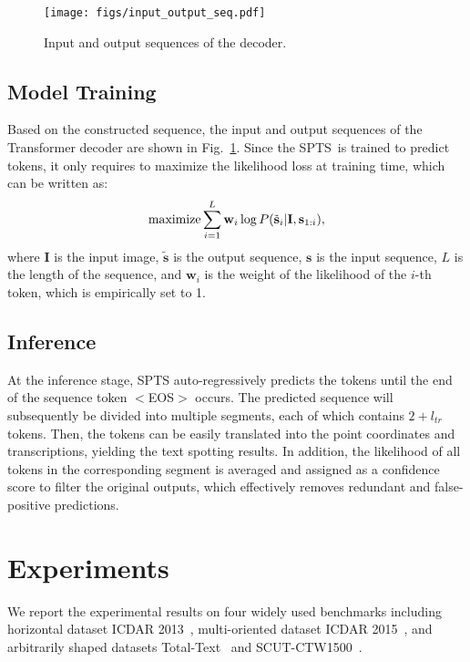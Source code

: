 \documentclass[sigconf]{acmart}
\newcommand{\methodName}{SPTS}
\begin{document}
\begin{figure}[t!]
    \centering
    \texttt{[image: figs/input\_output\_seq.pdf]}
    \caption{Input and output sequences of the decoder.}
    \label{fig:input_output_seq}
\end{figure}

\subsection{Model Training}





\def\bw{{\bf w}}
\def\bs{{\bf s}}
\def\bI{{\bf I}}
Based on the constructed sequence, the input and output sequences of the Transformer decoder are shown in Fig.~\ref{fig:input_output_seq}. Since the \methodName\ is trained to predict tokens, it only requires to maximize the likelihood loss at training time, which can be written as:
\begin{equation}
\label{eq_objective}
{\rm maximize} \sum_{i=1}^{L} {\bw}_i \log
 P(\tilde{{\bs}}_i | {\bI}, {\bs}_{1:i}),
\end{equation}
where $\textbf{I}$ is the input image, $\tilde{\textbf{s}}$ is the output sequence, $\textbf{s}$ is the input sequence, $ L$ is the length of the sequence, and $\textbf{w}_i$ is the weight of the likelihood of the $i$-th token, which is empirically set to 1.

\subsection{Inference}

At the inference stage, SPTS auto-regressively predicts the tokens until the end of the sequence token $<$EOS$>$ occurs. The predicted sequence will subsequently be divided into multiple segments, each of which contains $2 + l_{tr}$ tokens. Then, the tokens can be easily translated into the point coordinates and transcriptions, yielding the text spotting results. In addition, the likelihood of all tokens in the corresponding segment is averaged and assigned as a confidence score to filter the original outputs, which effectively removes redundant and false-positive predictions.


\section{Experiments}\label{sec:exp}

We report the experimental results on four widely used benchmarks including horizontal dataset ICDAR 2013~\cite{karatzas2013icdar}, multi-oriented dataset ICDAR 2015~\cite{karatzas2015icdar}, and arbitrarily shaped datasets Total-Text~\cite{ch2017total} and SCUT-CTW1500~\cite{liu2019curved}. 
    
\end{document}
